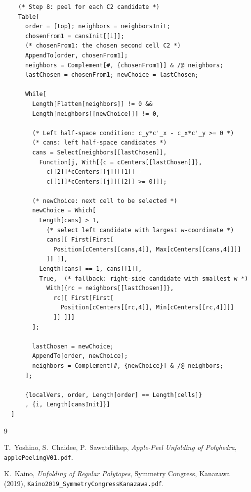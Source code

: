 \documentclass[12pt,a4paper]{article}
\theoremstyle{definition}
\begin{document}
\begin{lstlisting}
    (* Step 8: peel for each C2 candidate *)
    Table[
      order = {top}; neighbors = neighborsInit;
      chosenFrom1 = cansInit[[i]];
      (* chosenFrom1: the chosen second cell C2 *)
      AppendTo[order, chosenFrom1];
      neighbors = Complement[#, {chosenFrom1}] & /@ neighbors;
      lastChosen = chosenFrom1; newChoice = lastChosen;

      While[
        Length[Flatten[neighbors]] != 0 &&
        Length[neighbors[[newChoice]]] != 0,

        (* Left half-space condition: c_y*c'_x - c_x*c'_y >= 0 *)
        (* cans: left half-space candidates *)
        cans = Select[neighbors[[lastChosen]],
          Function[j, With[{c = cCenters[[lastChosen]]},
            c[[2]]*cCenters[[j]][[1]] -
            c[[1]]*cCenters[[j]][[2]] >= 0]]];

        (* newChoice: next cell to be selected *)
        newChoice = Which[
          Length[cans] > 1,
            (* select left candidate with largest w-coordinate *)
            cans[[ First[First[
              Position[cCenters[[cans,4]], Max[cCenters[[cans,4]]]]
            ]] ]],
          Length[cans] == 1, cans[[1]],
          True,  (* fallback: right-side candidate with smallest w *)
            With[{rc = neighbors[[lastChosen]]},
              rc[[ First[First[
                Position[cCenters[[rc,4]], Min[cCenters[[rc,4]]]]
              ]] ]]]
        ];

        lastChosen = newChoice;
        AppendTo[order, newChoice];
        neighbors = Complement[#, {newChoice}] & /@ neighbors;
      ];

      {localVers, order, Length[order] == Length[cells]}
      , {i, Length[cansInit]}]
  ]
\end{lstlisting}


\begin{thebibliography}{9}

  T.~Yoshino, S.~Chaidee, P.~Sawatdithep,
  \textit{Apple-Peel Unfolding of Polyhedra},
  \texttt{applePeelingV01.pdf}.

  K.~Kaino,
  \textit{Unfolding of Regular Polytopes},
  Symmetry Congress, Kanazawa (2019),
  \texttt{Kaino2019\_SymmetryCongressKanazawa.pdf}.

\end{thebibliography}
\end{document}
